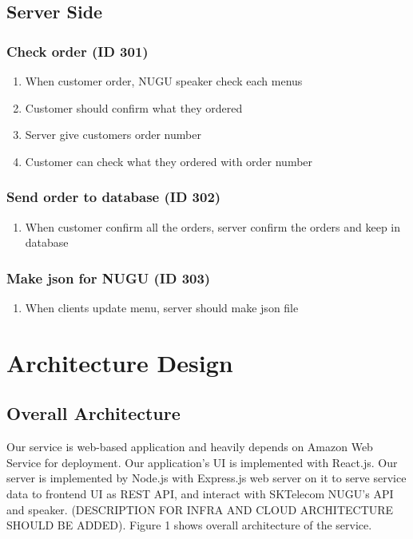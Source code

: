 \documentclass[conference,compsoc]{IEEEtran}
\begin{document}
\subsection{Server Side}

\subsubsection{Check order (ID 301)}
\begin{enumerate}
  \item When customer order, NUGU speaker check each menus
  \item Customer should confirm what they ordered
  \item Server give customers order number
  \item Customer can check what they ordered with order number  
\end{enumerate}

\subsubsection{Send order to database (ID 302)}
\begin{enumerate}
  \item When customer confirm all the orders, server confirm the orders and keep in database  
\end{enumerate}

\subsubsection{Make json for NUGU (ID 303)}
\begin{enumerate}
  \item When clients update menu, server should make json file
\end{enumerate}


\section{Architecture Design}

\subsection{Overall Architecture}

Our service is web-based application and heavily depends on Amazon Web Service for deployment. Our application's UI is implemented with React.js. Our server is implemented by Node.js with Express.js web server on it to serve service data to frontend UI as REST API, and interact with SKTelecom NUGU's API and speaker. (DESCRIPTION FOR INFRA AND CLOUD ARCHITECTURE SHOULD BE ADDED). Figure 1 shows overall architecture of the service.
\end{document}
